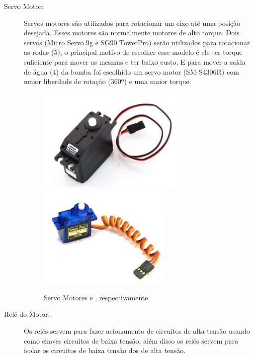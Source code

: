\begin{description}
\item[Servo Motor:] Servos motores são utilizados para rotacionar um eixo até
uma posição desejada. Esses motores são normalmente motores de alto torque.
Dois servos (Micro Servo 9g e SG90 TowerPro) serão utilizados para rotacionar
as rodas (5), o principal motivo de escolher esse modelo é ele ter torque
suficiente para mover as mesmas e ter baixo custo, E para mover a saída de água
(4) da bomba foi escolhido um servo motor (SM-S4306R) com maior liberdade de
rotação (360º) e uma maior torque.
\begin{figure}[h]
  \centering
	\includegraphics[height=5cm]{figures/servant-motor.png}
	\quad
	\includegraphics[height=5cm]{figures/micro-motor.png}
  \caption{Servo Motores \cite{flipflop2013} e \cite{flipflop2016}, respectivamente}
\end{figure}
\FloatBarrier

\item[Relé do Motor:] Os relés servem para fazer acionamento de circuitos
de alta tensão usando como chaves circuitos de baixa tensão, além disso os
 relés servem para isolar os circuitos de baixa tensão dos de alta tensão.
 

\end{description}
